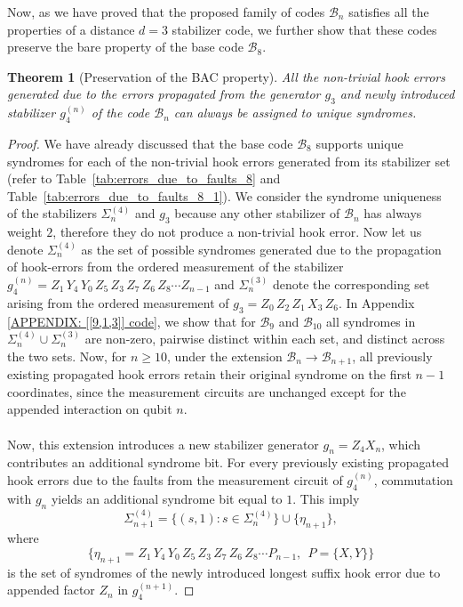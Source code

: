 \documentclass[reprint, amsmath,amssymb, aps,pra,
 floatfix,
]{revtex4-2}
\newtheorem{theorem}{Theorem}
\begin{document}
\noindent Now, as we have proved that the proposed family of codes $\mathcal{B}_n$ satisfies all the properties of a distance $d=3$ stabilizer code, we further show that these codes preserve the bare property of the base code $\mathcal{B}_8$.
\begin{theorem}[Preservation of the BAC property]
\label{thm:bare_recursion}
All the non-trivial hook errors generated due to the errors propagated from the generator $g_3$ and newly introduced stabilizer $g_4^{(n)}$ of the code $\mathcal{B}_n$ can always be assigned to unique syndromes.

\end{theorem}
\begin{proof}
We have already discussed that the base code $\mathcal{B}_8$ supports unique syndromes for each of the non-trivial hook errors generated from its stabilizer set (refer to Table~\ref{tab:errors_due_to_faults_8} and Table~\ref{tab:errors_due_to_faults_8_1}).
We consider the syndrome uniqueness of the stabilizers $\Sigma_n^{(4)}$ and $g_3$ because any other stabilizer of $\mathcal{B}_n$ has always weight $2$, therefore they do not produce a non-trivial hook error.
Now let us denote $\Sigma_n^{(4)}$ as the set of possible syndromes generated due to the propagation of hook-errors from the ordered measurement of the stabilizer $g_4^{(n)} = Z_1\, Y_4\, Y_0\, Z_5\, Z_3\, Z_7\, Z_6\, Z_8\cdots Z_{n-1}$ and $\Sigma_n^{(3)}$ denote the corresponding set arising from the ordered measurement of $g_3 = Z_0\, Z_2\, Z_1\, X_3\, Z_6$.
In Appendix \ref{APPENDIX: [[9,1,3]] code}, we show that for $\mathcal{B}_9$ and $\mathcal{B}_{10}$ all syndromes in $\Sigma_n^{(4)}\cup\Sigma_n^{(3)}$ are non-zero, pairwise distinct within each set, and distinct across the two sets.
Now, for $n \geq 10$, under the extension $\mathcal{B}_n\to\mathcal{B}_{n+1}$, all previously existing propagated hook errors retain their original syndrome on the first $n-1$ coordinates, since the measurement circuits are unchanged except for the appended interaction on qubit $n$.\\\\
Now, this extension introduces a new stabilizer generator $ g_n = Z_4 X_n$, which contributes an additional syndrome bit. 
For every previously existing propagated hook errors due to the faults from the measurement circuit of $g_4^{(n)}$, commutation with $g_n$ yields an additional syndrome bit equal to $1$.
This imply 
\[
\Sigma_{n+1}^{(4)} = \{(s,1): s\in \Sigma_n^{(4)}\}\cup\{\eta_{n+1}\},
\]
where \[\{\eta_{n+1} = Z_1\, Y_4\, Y_0\, Z_5\, Z_3\, Z_7\, Z_6\, Z_8\cdots P_{n-1}, \  \ P = \{X, Y\}\}\] is the set of syndromes of the newly introduced longest suffix hook error due to appended factor $Z_n$ in $g_4^{(n+1)}$. 

\end{proof}
\end{document}
